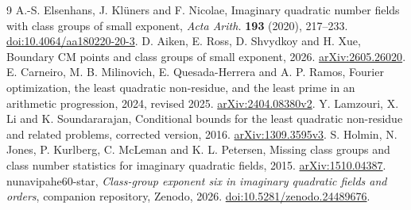 \documentclass[11pt,letterpaper]{article}
\newcommand{\arxivref}[1]{\href{https://arxiv.org/abs/#1}{arXiv:#1}}
\begin{document}
\begingroup
\small
\begin{thebibliography}{9}
\setlength{\itemsep}{1pt}
 A.-S. Elsenhans, J. Kl\"uners and F. Nicolae,
Imaginary quadratic number fields with class groups of small exponent,
\emph{Acta Arith.} \textbf{193} (2020), 217--233.
\href{https://doi.org/10.4064/aa180220-20-3}{doi:10.4064/aa180220-20-3}.
 D. Aiken, E. Ross, D. Shvydkoy and H. Xue,
Boundary CM points and class groups of small exponent, 2026.
\arxivref{2605.26020}.
 E. Carneiro, M. B. Milinovich, E. Quesada-Herrera and
A. P. Ramos, Fourier optimization, the least quadratic non-residue, and the
least prime in an arithmetic progression, 2024, revised 2025.
\arxivref{2404.08380v2}.
 Y. Lamzouri, X. Li and K. Soundararajan, Conditional bounds
for the least quadratic non-residue and related problems, corrected version,
2016. \arxivref{1309.3595v3}.
 S. Holmin, N. Jones, P. Kurlberg, C. McLeman and K. L. Petersen,
Missing class groups and class number statistics for imaginary quadratic
fields, 2015. \arxivref{1510.04387}.
 nunavipahe60-star, \emph{Class-group exponent six in imaginary
quadratic fields and orders}, companion repository, Zenodo, 2026.
\href{https://doi.org/10.5281/zenodo.24489676}{doi:10.5281/zenodo.24489676}.
\end{thebibliography}
\endgroup
\end{document}
